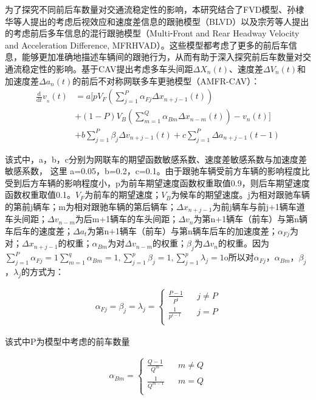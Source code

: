 \documentclass[final,5p,times,twocolumn,authoryear]{elsarticle}
\begin{document}
为了探究不同前后车数量对交通流稳定性的影响，本研究结合了FVD模型、孙棣华等人提出的考虑后视效应和速度差信息的跟驰模型（BLVD）以及宗芳等人提出的考虑前后多车信息的混行跟驰模型（Multi⁃Front and Rear Headway Velocity and Acceleration Difference, MFRHVAD）。这些模型都考虑了更多的前后车信息，能够更加准确地描述车辆间的跟驰行为，从而有助于深入探究前后车数量对交通流稳定性的影响。基于CAV提出考虑多车头间距$\Delta X_{n}(t)$、速度差$\Delta V_{n}(t)$和加速度差$\Delta a_{n}(t)$的前后不对称网联多车更驰模型（AMFR-CAV）：
\begin{equation}
    \begin{split}
           \frac{\mathrm{d}}{\mathrm{d}t}v_{_{n} } (t)
           &=a[pV_{F}(\sum_{j=1}^P\alpha_{Fj}\Delta x_{n+j-1}(t))\\
           &+(1-P)V_{B}(\sum_{m=1}^Q\alpha_{Bm}\Delta x_{n-m}(t))-v_{n}(t)]\\
           &+b\sum_{j=1}^P\beta_{j}\Delta v_{n+j-1}(t)+c\sum_{j=1}^{P}\Delta a_{n+j-1}(t-1)
    \end{split}
\end{equation}
\par
该式中，a，b，c分别为网联车的期望函数敏感系数、速度差敏感系数与加速度差敏感系数， 这里 a=0.05，b=0.2，c=0.1。由于跟驰车辆受前方车辆的影响程度比受到后方车辆的影响程度小，p为前车期望速度函数权重取值0.9，则后车期望速度函数权重取值0.1。$V_{F}$为前车的期望速度；$V_{B}$为候车的期望速度。j为相对跟驰车辆的第前j辆车；m为相对跟驰车辆的第后辆车；$\Delta x_{n+j-1}$为前j辆车与前j+1辆车道车头间距；$\Delta v_{n-m}$为后m+1辆车的车头间距；$\Delta v_{n}$为第n+1辆车（前车）与第n辆车后车的速度差；$\Delta a_{t}$为第n+1辆车（前车）与第n辆车后车的加速度差；$\alpha_{Fj}$为对；$\Delta x_{n+j-1}$的权重；$\alpha_{Bm}$为对$\Delta v_{n-m}$的权重；$\beta_{j}$为$\Delta v_{n}$的权重。因为$\sum_{j=1}^P\alpha _{Fj}=1\sum_{m=1}^q\alpha _{Bm}=1,\sum_{j=1}^p\beta_{j}=1,\sum_{j=1}^p\lambda_{j}=1$o所以对$\alpha_{Fj}$，$\alpha_{Bm}$，$\beta_{j}$，$\lambda_{j}$的方式为：
\par
	\begin{eqnarray}
		\alpha_{Fj}=\beta_{j}=\lambda_{j}=\left\{
		\begin{aligned}
			\frac{P-1}{P^{i}} &  &{j\neq P} \\
			\frac{1}{p^{i-1}} &  &{j=P}     \\
		\end{aligned}
		\right.
	\end{eqnarray}
\par
该式中P为模型中考虑的前车数量
\par
	\begin{eqnarray}
		\alpha_{Bm}=\left\{
		\begin{aligned}
			\frac{Q-1}{Q^{m}} &  &{m\neq Q} \\
			\frac{1}{Q^{m-1}} &  &{m=Q}     \\
		\end{aligned}
		\right.
	\end{eqnarray}
\end{document}

